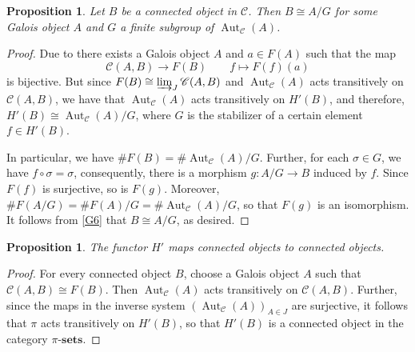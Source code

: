 \documentclass[10pt]{article}
\theoremstyle{thmstyle}
\newtheorem{proposition}[theorem]{Proposition}
\theoremstyle{defstyle}
\newcommand{\sets}[1]{#1\text{-}\mathbf{sets}}
\newcommand{\Aut}{\operatorname{Aut}}
\newcommand{\scrC}{\mathscr{C}} %
\begin{document}
\begin{proposition}
    Let $B$ be a connected object in $\scrC$. Then $B\cong A/G$ for some Galois object $A$ and $G$ a finite subgroup of $\Aut_{\scrC}(A)$.
\end{proposition}
\begin{proof}
    Due to  there exists a Galois object $A$ and $a\in F(A)$ such that the map 
    \begin{equation*}
        \scrC(A, B)\longrightarrow F(B)\qquad f\longmapsto F(f)(a)
    \end{equation*}
    is bijective. But since $F(B)\cong\varinjlim_J\scrC(A, B)$ and $\Aut_{\scrC}(A)$ acts transitively on $\scrC(A, B)$, we have that $\Aut_{\scrC}(A)$ acts transitively on $H'(B)$, and therefore, $H'(B)\cong\Aut_{\scrC}(A)/G$, where $G$ is the stabilizer of a certain element $f\in H'(B)$.

    In particular, we have $\# F(B) = \#\Aut_{\scrC}(A)/G$. Further, for each $\sigma\in G$, we have $f\circ\sigma = \sigma$, consequently, there is a morphism $g: A/G\to B$ induced by $f$. Since $F(f)$ is surjective, so is $F(g)$. Moreover, $\# F(A/G) = \# F(A)/G = \#\Aut_{\scrC}(A)/G$, so that $F(g)$ is an isomorphism. It follows from \ref{G6} that $B\cong A/G$, as desired.
\end{proof}

\begin{proposition}
    The functor $H'$ maps connected objects to connected objects.
\end{proposition}
\begin{proof}
    For every connected object $B$, choose a Galois object $A$ such that $\scrC(A, B)\cong F(B)$. Then $\Aut_{\scrC}(A)$ acts transitively on $\scrC(A, B)$. Further, since the maps in the inverse system $(\Aut_{\scrC}(A))_{A\in J}$ are surjective, it follows that $\pi$ acts transitively on $H'(B)$, so that $H'(B)$ is a connected object in the category $\sets{\pi}$.
\end{proof}
\end{document}
